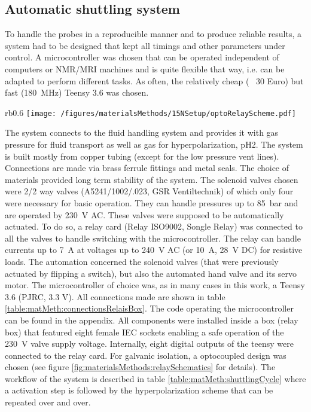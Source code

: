         \subsection{Automatic shuttling system}
    To handle the probes in a reproducible manner and to produce reliable results, a system had to be designed that kept all timings and other parameters under control. A microcontroller was chosen that can be operated independent of computers or NMR/MRI machines and is quite flexible that way, i.e. can be adapted to perform different tasks. As often, the relatively cheap (~ 30 Euro) but fast (\SI{180}{\mega\hertz}) Teensy 3.6 was chosen.
            \begin{wrapfigure}{rb}{0.6\textwidth}
                \texttt{[image: /figures/materialsMethods/15NSetup/optoRelayScheme.pdf]}
                \caption[Relay schematics]{One relay module of which 8 were mounted onto a single PCB board in this case. Note the galvanic isolation through the optocoupler in the top center of the schematics.}
                \label{fig:materialsMethods:relaySchematics}
            \end{wrapfigure}
            The system connects to the fluid handling system and provides it with gas pressure for fluid transport as well as gas for hyperpolarization, pH2. The system is built mostly from copper tubing (except for the low pressure vent lines). Connections are made via brass ferrule fittings and metal seals. The choice of materials provided long term stability of the system. The solenoid valves chosen were 2/2 way valves (A5241/1002/.023, GSR Ventiltechnik) of which only four were necessary for basic operation. They can handle pressures up to \SI{85}{\bar} and are operated by \SI{230}{\volt} AC. These valves were supposed to be automatically actuated.
            To do so, a relay card (Relay ISO9002, Songle Relay) was connected to all the valves to handle switching with the microcontroller. The relay can handle currents up to \SI{7}{\ampere} at voltages up to \SI{240}{\volt} AC (or \SI{10}{\ampere}, \SI{28}{\volt} DC) for resistive loads. The automation concerned the solenoid valves (that were previously actuated by flipping a switch), but also the automated hand valve and its servo motor. The microcontroller of choice was, as in many cases in this work, a Teensy 3.6 (PJRC, 3.3 V). All connections made are shown in table \ref{table:matMeth:connectionsRelaisBox}. The code operating the microcontroller can be found in the appendix. All components were installed inside a box (relay box) that featured eight female IEC sockets enabling a safe operation of the \SI{230}{\volt} valve supply voltage.  Internally, eight digital outputs of the teensy were connected to the relay card.  For galvanic isolation, a optocoupled design was chosen (see figure \ref{fig:materialsMethods:relaySchematics} for details). The workflow of the system is described in table \ref{table:matMeth:shuttlingCycle} where a activation step is followed by the hyperpolarization scheme that can be repeated over and over.

